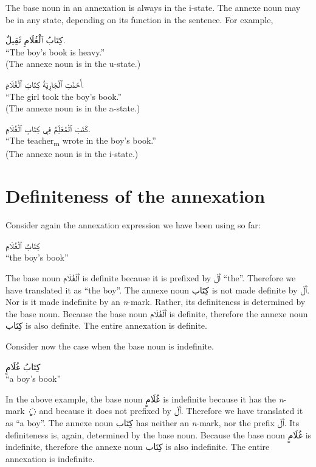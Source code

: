 \documentclass[
  10pt,
]{book}
\begin{document}
The base noun in an annexation is always in the i-state. The annexe noun may be in any state, depending on its function in the sentence. For example,

\foreignlanguage{arabic}{کِتَابُ ٱلْغُلَامِ ثَقِيلٌ.}\\
\enquote{The boy's book is heavy.}\\
(The annexe noun is in the u-state.)

\foreignlanguage{arabic}{أَخَذَتِ ٱلْجَارِيَةُ کِتَابَ ٱلْغُلَامِ.}\\
\enquote{The girl took the boy's book.}\\
(The annexe noun is in the a-state.)

\foreignlanguage{arabic}{کَتَبَ ٱلْمُعَلِّمُ فِي کِتَابِ ٱلْغُلَامِ.}\\
\enquote{The teacher\textsubscript{m} wrote in the boy's book.}\\
(The annexe noun is in the i-state.)

\section{Definiteness of the annexation}\label{definiteness-of-the-annexation}

Consider again the annexation expression we have been using so far:

\foreignlanguage{arabic}{کِتَابُ ٱلْغُلَامِ}\\
\enquote{the boy's book}

The base noun \foreignlanguage{arabic}{ٱَلْغُلَام} is definite because it is prefixed by \foreignlanguage{arabic}{ٱَلْ} \enquote{the}.
Therefore we have translated it as \enquote{the boy}.
The annexe noun \foreignlanguage{arabic}{کِتَاب} is not made definite by \foreignlanguage{arabic}{ٱَلْ}.
Nor is it made indefinite by an \emph{n}-mark.
Rather, its definiteness is determined by the base noun.
Because the base noun \foreignlanguage{arabic}{ٱَلْغُلَام} is definite, therefore the annexe noun \foreignlanguage{arabic}{کِتَاب} is also definite.
The entire annexation is definite.

Consider now the case when the base noun is indefinite.

\foreignlanguage{arabic}{کِتَابُ غُلَامٍ}\\
\enquote{a boy's book}

In the above example, the base noun \foreignlanguage{arabic}{غُلَامٍ} is indefinite because it has the \emph{n}-mark~\foreignlanguage{arabic}{◌ٍ} and because it does not prefixed by \foreignlanguage{arabic}{ٱَلْ}. Therefore we have translated it as \enquote{a boy}.
The annexe noun \foreignlanguage{arabic}{کِتَاب} has neither an \emph{n}-mark, nor the prefix \foreignlanguage{arabic}{ٱَلْ}.
Its definiteness is, again, determined by the base noun.
Because the base noun \foreignlanguage{arabic}{غُلَامٍ} is indefinite, therefore the annexe noun \foreignlanguage{arabic}{کِتَاب} is also indefinite.
The entire annexation is indefinite.
\end{document}
